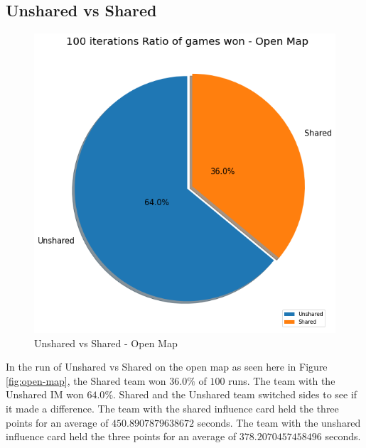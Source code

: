 \documentclass[]{report}
\begin{document}
		\clearpage
		\subsection{Unshared vs Shared}
		\begin{figure}[h!]
			\centering
			\includegraphics[width=0.9\linewidth]{"Images/100 Games Unshared vs Shared Open Map"}
			\caption[Unshared vs Shared - Open Map]{Unshared vs Shared - Open Map}
			\label{fig:100-games-unshared-vs-shared-open-map}
		\end{figure}
		In the run of Unshared vs Shared on the open map as seen here in Figure \ref{fig:open-map}, the Shared team won $36.0\%$ of $100$ runs. The team with the Unshared \ac{IM} won $64.0\%$. Shared and the Unshared team switched sides to see if it made a difference. The team with the shared influence card held the three points for an average of $450.8907879638672$ seconds. The team with the unshared influence card held the three points for an average of $378.2070457458496$ seconds.
		
		\clearpage
\end{document}
